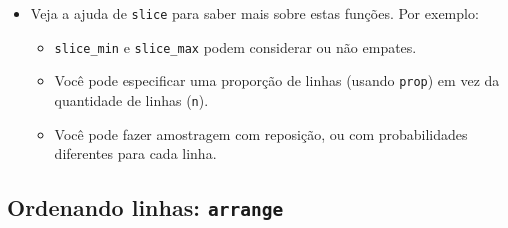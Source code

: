 \documentclass[
  11pt]{report}
\newenvironment{Shaded}{\begin{snugshade}}{\end{snugshade}}
\newcommand{\AttributeTok}[1]{\textcolor[rgb]{0.77,0.63,0.00}{#1}}
\newcommand{\DecValTok}[1]{\textcolor[rgb]{0.00,0.00,0.81}{#1}}
\newcommand{\DocumentationTok}[1]{\textcolor[rgb]{0.56,0.35,0.01}{\textbf{\textit{#1}}}}
\newcommand{\FunctionTok}[1]{\textcolor[rgb]{0.00,0.00,0.00}{#1}}
\newcommand{\NormalTok}[1]{#1}
\newcommand{\SpecialCharTok}[1]{\textcolor[rgb]{0.00,0.00,0.00}{#1}}
\renewenvironment{Shaded}{
    \begin{mdframed}[%
      roundcorner=2pt,%
      innerleftmargin=5pt,%
      innerrightmargin=5pt,%
      topline=true,%
      leftline=true,%
      rightline=true,%
      bottomline=true,%
      linewidth=0.5pt,%
      linecolor=black!20,%
      backgroundcolor=black!2,%
      skipabove=2ex,%
      skipbelow=2.5ex%
    ]%
  }
  {
    \end{mdframed}
  }
\begin{document}
\begin{itemize}
\begin{Shaded}
\begin{Highlighting}[]
\NormalTok{bb\_tidy }\SpecialCharTok{\%\textgreater{}\%} 
  \FunctionTok{slice\_sample}\NormalTok{(}\AttributeTok{n =} \DecValTok{5}\NormalTok{)}
\DocumentationTok{\#\# \# A tibble: 5 x 5}
\DocumentationTok{\#\#   artista              musica                  entrou     semana   pos}
\DocumentationTok{\#\#   \textless{}chr\textgreater{}                \textless{}chr\textgreater{}                   \textless{}date\textgreater{}      \textless{}int\textgreater{} \textless{}dbl\textgreater{}}
\DocumentationTok{\#\# 1 matchbox twenty      Bent                    2000{-}04{-}29     25    12}
\DocumentationTok{\#\# 2 Hill, Faith          Let\textquotesingle{}s Make Love         2000{-}08{-}12      8    60}
\DocumentationTok{\#\# 3 Backstreet Boys, The Show Me The Meaning ... 2000{-}01{-}01      9    12}
\DocumentationTok{\#\# 4 Joe                  Treat Her Like A Lad... 2000{-}08{-}05     12    84}
\DocumentationTok{\#\# 5 Dixie Chicks, The    Cowboy Take Me Away     1999{-}11{-}27     20    59}
\end{Highlighting}
\end{Shaded}
\item
  Veja a ajuda de \texttt{slice} para saber mais sobre estas funções. Por exemplo:

  \begin{itemize}
  \item
    \texttt{slice\_min} e \texttt{slice\_max} podem considerar ou não empates.
  \item
    Você pode especificar uma proporção de linhas (usando \texttt{prop}) em vez da quantidade de linhas (\texttt{n}).
  \item
    Você pode fazer amostragem com reposição, ou com probabilidades diferentes para cada linha.
  \end{itemize}
\end{itemize}

\hypertarget{ordenando-linhas-arrange}{%
\subsection{\texorpdfstring{Ordenando linhas: \texttt{arrange}}{Ordenando linhas: arrange}}\label{ordenando-linhas-arrange}}
\end{document}
